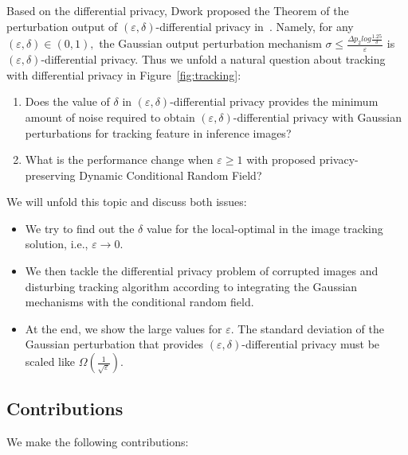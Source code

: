 \documentclass[trans]{IEEEtran}
\begin{document}
Based on the differential privacy, Dwork proposed the Theorem of the perturbation output of $(\varepsilon,\delta)$-differential privacy in~\cite{dwork2009complexity}. Namely, for any $(\varepsilon,\delta)\in (0,1),$ the Gaussian output perturbation mechanism $\sigma \leq \frac{\Delta p_2 log\frac{1.25}{\delta}}{\varepsilon}$  is $(\varepsilon,\delta)$-differential privacy.  Thus we unfold a natural question about tracking with differential privacy in Figure~\ref{fig:tracking}: 

\begin{enumerate}
    \item Does the value of $\delta$ in $(\varepsilon,\delta)$-differential privacy provides the minimum amount of noise required to obtain $(\varepsilon,\delta)$-differential privacy with Gaussian perturbations for tracking feature in inference images?
    \item What is the performance change when $\varepsilon \geq 1$ with proposed privacy-preserving Dynamic Conditional Random Field?  
\end{enumerate}

We will unfold this topic and discuss both issues: 
\begin{itemize}
\item We try to find out the $\delta$ value for the local-optimal in the image tracking solution, i.e.,  $\varepsilon \rightarrow 0$.
\item We then tackle the differential privacy problem of corrupted images and disturbing tracking algorithm according to integrating the Gaussian mechanisms with the conditional random field. 
\item At the end, we show the large values for $\varepsilon$. The standard deviation of the Gaussian perturbation that provides $(\varepsilon,\delta)$-differential privacy must be scaled like $\Omega(\frac{1}{\sqrt{\varepsilon}})$. 
    
\end{itemize}


\subsection{Contributions}
We make the following contributions:
\end{document}
